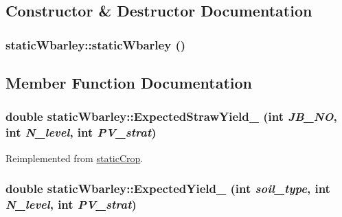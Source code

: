 \subsection{Constructor \& Destructor Documentation}
\hypertarget{classstatic_wbarley_acec00af600f34672e3aadf804c1815fd}{
\subsubsection[{staticWbarley}]{\setlength{\rightskip}{0pt plus 5cm}staticWbarley::staticWbarley ()}}
\label{classstatic_wbarley_acec00af600f34672e3aadf804c1815fd}


\subsection{Member Function Documentation}
\hypertarget{classstatic_wbarley_a6393940adf0cf43b69854fc2050e5eda}{
\subsubsection[{ExpectedStrawYield\_\-}]{\setlength{\rightskip}{0pt plus 5cm}double staticWbarley::ExpectedStrawYield\_\- (int {\em JB\_\-NO}, \/  int {\em N\_\-level}, \/  int {\em PV\_\-strat})}}
\label{classstatic_wbarley_a6393940adf0cf43b69854fc2050e5eda}


Reimplemented from \hyperlink{classstatic_crop_a884a8335aebc5effa3fecdb75af3ca85}{staticCrop}.\hypertarget{classstatic_wbarley_a247a23ce822b41692fb07633cd332423}{
\subsubsection[{ExpectedYield\_\-}]{\setlength{\rightskip}{0pt plus 5cm}double staticWbarley::ExpectedYield\_\- (int {\em soil\_\-type}, \/  int {\em N\_\-level}, \/  int {\em PV\_\-strat})}}
\label{classstatic_wbarley_a247a23ce822b41692fb07633cd332423}


